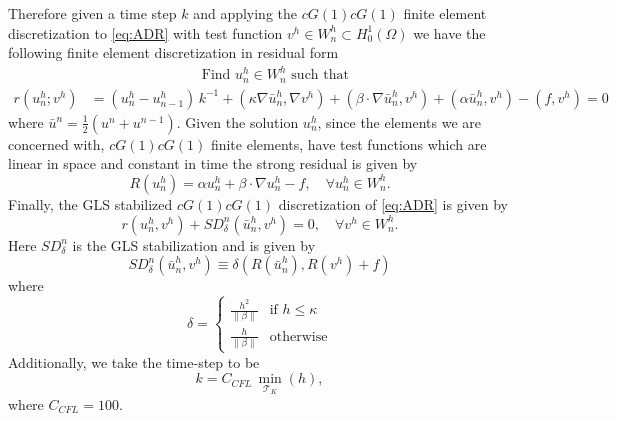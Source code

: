     Therefore given a time step $k$ and applying the $cG(1)cG(1)$ finite element
    discretization to \eqref{eq:ADR} with test function $v^h \in W^h_n \subset
    H^1_0(\Omega)$ we have the following finite element discretization
    in residual form
    \begin{equation}
    \begin{split}
        &\hspace{8em}\text{Find } u^h_n \in W^h_n \text{ such that} \\
        r(u^h_n; v^h) &= \left(u^h_n - u^h_{n-1}\right)\,k^{-1}
            + (\kappa \nabla \bar{u}^h_n, \nabla v^h)
            + (\beta \cdot \nabla \bar{u}^h_n, v^h)
            + (\alpha \bar{u}^h_n, v^h) - (f, v^h) = 0
    \end{split}
    \label{eqn:WeakADR}
    \end{equation}
    where $\bar{u}^n = \frac{1}{2}\left(u^n + u^{n-1}\right)$. Given the
    solution $u^h_n$, since the elements we are concerned with, $cG(1)cG(1)$
    finite elements, have test functions which are linear in space and constant
    in time the strong residual is given by
    \begin{equation}
        R(u^h_n) = \alpha u^h_n + \beta \cdot \nabla u^h_n - f, \quad \forall
            u^h_n \in W^h_n.
    \label{eqn:StrongADR}
    \end{equation}
    Finally, the GLS stabilized $cG(1)cG(1)$ discretization of \eqref{eq:ADR} is
    given by
    \begin{equation}
        r(u^h_n, v^h) + SD_{\delta}^n(\bar{u}^h_n,v^h) = 0,
            \quad \forall v^h \in W^h_n.
        \label{eqn:G2ADR}
    \end{equation}
    Here $SD_{\delta}^n$ is the GLS stabilization and is given by
    \begin{equation}
        SD_{\delta}^n(\bar{u}^h_n, v^h) \equiv
            \delta \left(R(\bar{u}^h_n), R(v^h) + f\right)
    \label{eq:ADRStabilization}
    \end{equation}
    where
    \begin{equation}
        \delta = \begin{cases}
            \frac{h^2}{\|\beta\|} & \text{if } h \le \kappa \\
            \frac{h}{\|\beta\|} & \text{otherwise}
        \end{cases}
        \label{eq:ADRdelta}
    \end{equation}
    Additionally, we take the time-step to be
    \begin{equation*}
        k = C_{CFL}\, \min_{\mathcal{T}_K}(h),
    \end{equation*}
    where $C_{CFL}=100$.

